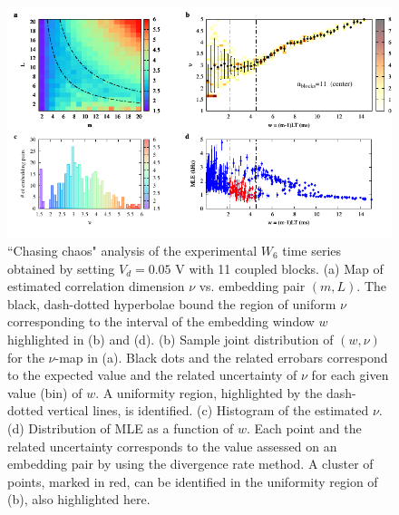 \begin{figure}[H]
    \centering
    \includegraphics[width=\linewidth]{../blocks/11_blocks/middle/2e5_points/plots/chaos_low.pdf}
    \caption{``Chasing chaos" analysis of the experimental $W_6$ time series obtained by setting $V_d=0.05$ V with 11 coupled blocks.
    (a) Map of estimated correlation dimension $\nu$ vs. embedding pair $(m, L)$.
    The black, dash-dotted hyperbolae bound the region of uniform $\nu$ corresponding to the interval of the
    embedding window $w$ highlighted in (b) and (d).
    (b) Sample joint distribution of $(w,\nu)$ for the $\nu$-map in (a).
    Black dots and the related errobars correspond to the expected value and the related uncertainty of $\nu$
    for each given value (bin) of $w$. A uniformity region, highlighted by the dash-dotted vertical lines,
    is identified. (c) Histogram of the estimated $\nu$. (d) Distribution of MLE as a function of $w$. Each point and the related
    uncertainty corresponds to the value assessed on an embedding pair by using the divergence rate method.
    A cluster of points, marked in red, can be identified in the uniformity region of (b), also highlighted here.}
    \label{fig:11 blocks chaos middle}
\end{figure}


